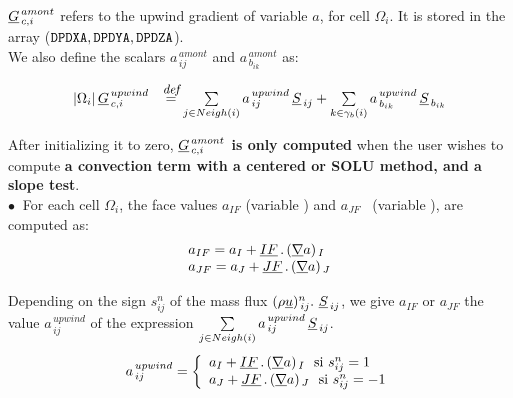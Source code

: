 $\underline{G}^{\,amont}_{\,c,i}$ refers to the upwind gradient of variable $a$, for cell $\Omega_i$.
It is stored in the array ($\text{\texttt{DPDXA}}, \text{\texttt{DPDYA}}, \text{\texttt{DPDZA}}$).\\
We also define the scalars $a^{\,amont}_{\,ij}$
and $a^{\,amont}_{\,b_{ik}}$ as:

\begin{equation}\label{Base_Bilsc2_Eq_grad_decentre}
\begin{array}{ll}
|\Omega_i|\,\underline{G}^{\,upwind}_{\,c,i}&\overset{\text{\it\small def}}{=}
\sum\limits_{j\in Neigh\left(i\right)}a^{\,upwind}_{\,ij}\,{\underline{S}_{\,ij}} + \sum\limits_{k\in {\gamma_b(i)}}a^{\,upwind}_{\,b_{ik}}\,\underline{S}_{\,{b}_{ik}} \\
\end{array}
\end{equation}

After initializing it to zero, {\bf $\underline{G}^{\,amont}_{\,c,i}$ is only computed} when
the user wishes to compute {\bf a convection term with a centered or SOLU method, and a slope test}.\\
$\bullet \ $ For each cell $\Omega_i$, the face values $a_{IF}$ (variable ) and $a_{JF}$~ (variable ), are computed as:\\
\begin{equation}\notag
\begin{array}{ll}
a_{IF}= a_I + \underline{IF}\,.\,(\underline{\nabla} a)_{\,I} \\
a_{JF}= a_J + \underline{JF}\,.\,(\underline{\nabla} a)_{\,J} \\
\end{array}
\end{equation}

Depending on the sign $s^n_{ij}$ of the mass flux $(\rho \vect{u})_{\,ij}^n.\ \vect{S}_{\,ij}$,
we give $a_{IF}$ or $a_{JF}$ the value $a^{\,upwind}_{\,ij}$ of the expression
 $\sum\limits_{j\in Neigh\left(i\right)}a^{\,upwind}_{\,ij}\,{\underline{S}_{\,ij}}$.\\
\begin{equation}\notag
a^{\,upwind}_{\,ij}=\left\lbrace\begin{array}{l}
a_I +\underline{IF}\,.\,(\underline{\nabla} a)_{\,I}
\text{\ \  si } s^n_{ij} = 1\\
a_J + \underline{JF}\,.\,(\underline{\nabla} a)_{\,J}
\text{\ \  si } s^n_{ij} = - 1
\end{array}\right.
\end{equation}

